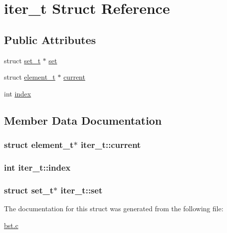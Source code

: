 \hypertarget{structiter__t}{\section{iter\-\_\-t Struct Reference}
\label{structiter__t}
}
\subsection*{Public Attributes}
\begin{DoxyCompactItemize}
\item 
struct \hyperlink{structset__t}{set\-\_\-t} $\ast$ \hyperlink{structiter__t_abd864733c57099a3cd1ee4ffa3244682}{set}
\item 
struct \hyperlink{structelement__t}{element\-\_\-t} $\ast$ \hyperlink{structiter__t_a844b26494a5ee886950fe3a938f36749}{current}
\item 
int \hyperlink{structiter__t_a8db9521cd3633a6753c3a91eac440d16}{index}
\end{DoxyCompactItemize}


\subsection{Member Data Documentation}
\hypertarget{structiter__t_a844b26494a5ee886950fe3a938f36749}{
\subsubsection[{current}]{\setlength{\rightskip}{0pt plus 5cm}struct {\bf element\-\_\-t}$\ast$ iter\-\_\-t\-::current}}\label{structiter__t_a844b26494a5ee886950fe3a938f36749}
\hypertarget{structiter__t_a8db9521cd3633a6753c3a91eac440d16}{
\subsubsection[{index}]{\setlength{\rightskip}{0pt plus 5cm}int iter\-\_\-t\-::index}}\label{structiter__t_a8db9521cd3633a6753c3a91eac440d16}
\hypertarget{structiter__t_abd864733c57099a3cd1ee4ffa3244682}{
\subsubsection[{set}]{\setlength{\rightskip}{0pt plus 5cm}struct {\bf set\-\_\-t}$\ast$ iter\-\_\-t\-::set}}\label{structiter__t_abd864733c57099a3cd1ee4ffa3244682}


The documentation for this struct was generated from the following file\-:\begin{DoxyCompactItemize}
\item 
\hyperlink{bst_8c}{bst.\-c}\end{DoxyCompactItemize}
